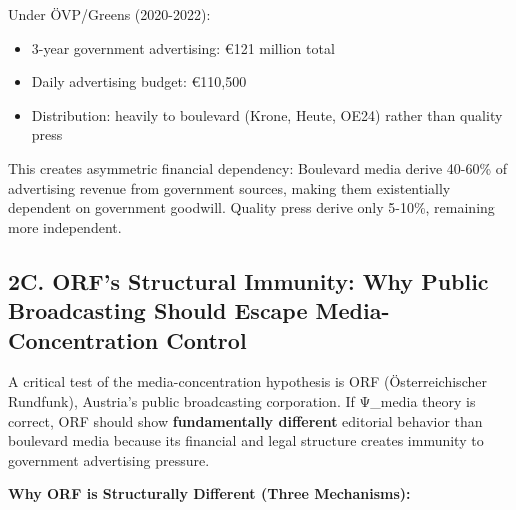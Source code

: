 Under ÖVP/Greens (2020-2022):
\begin{itemize}
\item 3-year government advertising: €121 million total
\item Daily advertising budget: €110,500
\item Distribution: heavily to boulevard (Krone, Heute, OE24) rather than quality press
\end{itemize}

This creates asymmetric financial dependency: Boulevard media derive 40-60\% of
advertising revenue from government sources, making them existentially dependent
on government goodwill. Quality press derive only 5-10\%, remaining more independent.

\label{sec:dx-orf-immunity}

\subsection*{2C. ORF's Structural Immunity: Why Public Broadcasting Should Escape Media-Concentration Control}

A critical test of the media-concentration hypothesis is ORF (Österreichischer Rundfunk), Austria's
public broadcasting corporation. If Ψ_media theory is correct, ORF should show \textbf{fundamentally different}
editorial behavior than boulevard media because its financial and legal structure creates immunity to
government advertising pressure.

\textbf{Why ORF is Structurally Different (Three Mechanisms):}


